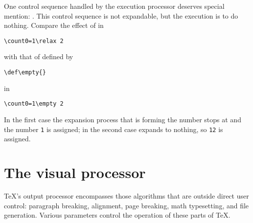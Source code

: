 \documentclass{book}
\begin{document}
One control sequence handled by the execution processor 
deserves special mention: .
This control sequence is not expandable, but the execution
is to do nothing. Compare the effect of  in
\begin{verbatim}
\count0=1\relax 2
\end{verbatim}
with that of 
defined by
\begin{verbatim}
\def\empty{}
\end{verbatim}
in 
\begin{verbatim}
\count0=1\empty 2
\end{verbatim}
In the first case the expansion
process that is forming the number stops at  and
the number {\tt 1} is assigned; in the second case 
 expands to nothing, so {\tt 12} is assigned.

\section{The visual processor}

\TeX's output processor encompasses those algorithms that
are outside direct user control: paragraph breaking,
alignment, page breaking, math typesetting, and  file
generation. Various parameters control the operation
of these parts of \TeX.
\end{document}

